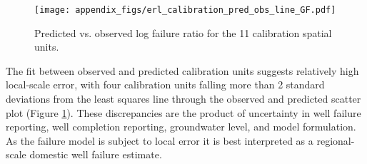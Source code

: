 \begin{figure}[H]
	\texttt{[image: appendix\_figs/erl\_calibration\_pred\_obs\_line\_GF.pdf]}
	\caption{Predicted vs. observed log failure ratio for the 11 calibration spatial units. }
	\label{fig:calib_line}
\end{figure}

The fit between observed and predicted calibration units suggests relatively high local-scale error, with four calibration units falling more than 2 standard deviations from the least squares line through the observed and predicted scatter plot (Figure \ref{fig:calib_line}). These discrepancies are the product of uncertainty in well failure reporting, well completion reporting, groundwater level, and model formulation. As the failure model is subject to local error it is best interpreted as a regional-scale domestic well failure estimate. 

\clearpage

